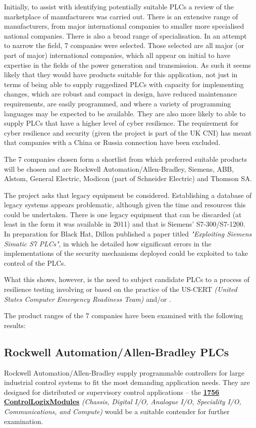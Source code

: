 Initially, to assist with identifying potentially suitable PLCs a review of the marketplace of manufacturers was carried out. There is an extensive range of manufacturers, from major international companies to smaller more specialised national companies. There is also a broad range of specialisation. In an attempt to narrow the field, 7 companies were selected. Those selected are all major (or part of major) international companies, which all appear on initial to have expertise in the fields of the power generation and transmission. As such it seems likely that they would have products suitable for this application, not just in terms of being able to supply ruggedized PLCs with capacity for implementing changes, which are robust and compact in design, have reduced maintenance requirements, are easily programmed, and where a variety of programming languages may be expected to be available. They are also more likely to able to supply PLCs that have a higher level of cyber resilience. The requirement for cyber resilience and security (given the project is part of the UK CNI) has meant that companies with a China or Russia connection have been excluded.

The 7 companies chosen form a shortlist from which preferred suitable products will be chosen and are Rockwell Automation/Allen-Bradley, Siemens, ABB, Alstom, General Electric, Modicon (part of Schneider Electric) and Thomson SA.

The project asks that legacy equipment be considered. Establishing a database of legacy systems appears problematic, although given the time and resources this could be undertaken. There is one legacy equipment that can be discarded (at least in the form it was available in 2011) and that is Siemens' S7-300/S7-1200. In preparation for Black Hat, Dillon \citet{pdf:blackhat:siemensscada:20110711} published a paper titled \textit{"Exploiting Siemens Simatic S7 PLCs"}, in which he detailed how significant errors in the implementations of the security mechanisms deployed could be exploited to take control of the PLCs.

What this shows, however, is the need to subject candidate PLCs to a process of resilience testing involving or based on the practice of the US-CERT \textit{(United States Computer Emergency Readiness Team)} and/or \citet{site:ics-cert:standards:20180427}.

The product ranges of the 7 companies have been examined with the following results:
\subsection{Rockwell Automation/Allen-Bradley PLCs}
Rockwell Automation/Allen-Bradley supply programmable controllers for large industrial control systems to fit the most demanding application needs. They are designed for distributed or supervisory control applications -- the \href{https://ab.rockwellautomation.com/IO/Chassis-Based/1756-ControlLogix-IO}{\textbf{1756 ControlLogix\textregistered Modules}} \textit{(Chassis, Digital I/O, Analogue I/O, Speciality I/O, Communications, and Compute)} would be a suitable contender for further examination.
